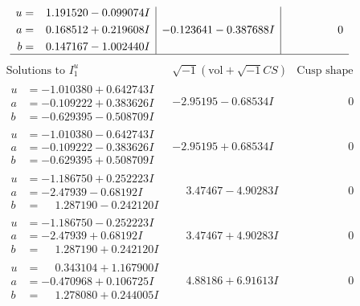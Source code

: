 \documentclass[1p]{elsarticle_modified}
\theoremstyle{definition}
\newcommand{\I}{\sqrt{-1}}
\begin{document}
$$\begin{array}{c|c|c}
\begin{aligned}
u &= \phantom{-}1.191520 - 0.099074 I \\
a &= \phantom{-}0.168512 + 0.219608 I \\
b &= \phantom{-}0.147167 - 1.002440 I\end{aligned}
 & -0.123641 - 0.387688 I & \phantom{-0.000000 } 0\\
 \hline 
 \end{array}$$\newpage$$\begin{array}{c|c|c}  
\text{Solutions to }I^u_{1}& \I (\text{vol} + \sqrt{-1}CS) & \text{Cusp shape}\\
 \hline 
\begin{aligned}
u &= -1.010380 + 0.642743 I \\
a &= -0.109222 + 0.383626 I \\
b &= -0.629395 - 0.508709 I\end{aligned}
 & -2.95195 - 0.68534 I & \phantom{-0.000000 } 0 \\ \hline\begin{aligned}
u &= -1.010380 - 0.642743 I \\
a &= -0.109222 - 0.383626 I \\
b &= -0.629395 + 0.508709 I\end{aligned}
 & -2.95195 + 0.68534 I & \phantom{-0.000000 } 0 \\ \hline\begin{aligned}
u &= -1.186750 + 0.252223 I \\
a &= -2.47939 - 0.68192 I \\
b &= \phantom{-}1.287190 - 0.242120 I\end{aligned}
 & \phantom{-}3.47467 - 4.90283 I & \phantom{-0.000000 } 0 \\ \hline\begin{aligned}
u &= -1.186750 - 0.252223 I \\
a &= -2.47939 + 0.68192 I \\
b &= \phantom{-}1.287190 + 0.242120 I\end{aligned}
 & \phantom{-}3.47467 + 4.90283 I & \phantom{-0.000000 } 0 \\ \hline\begin{aligned}
u &= \phantom{-}0.343104 + 1.167900 I \\
a &= -0.470968 + 0.106725 I \\
b &= \phantom{-}1.278080 + 0.244005 I\end{aligned}
 & \phantom{-}4.88186 + 6.91613 I & \phantom{-0.000000 } 0 \\ \hline\begin{aligned}

\end{aligned}
\end{array}$$
\end{document}

